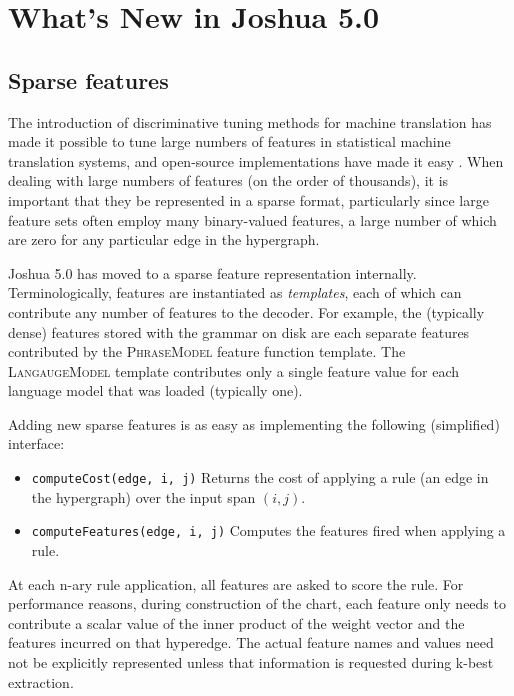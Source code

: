 \documentclass[11pt]{article}
\begin{document}
\section{What's New in Joshua 5.0}

\subsection{Sparse features}


The introduction of discriminative tuning methods for machine
translation \cite{liang2006end,chiang2008online,PRO2011} has made it
possible to tune large numbers of features in statistical machine
translation systems, and open-source implementations have made it easy
\cite{cherry2012batch}.  When dealing with large numbers of features
(on the order of thousands), it is important that they be represented
in a sparse format, particularly since large feature sets often employ
many binary-valued features, a large number of which are zero for any
particular edge in the hypergraph.

Joshua 5.0 has moved to a sparse feature representation
internally. Terminologically, features are instantiated as
\emph{templates}, each of which can contribute any number of features
to the decoder. For example, the (typically dense) features stored
with the grammar on disk are each separate features contributed by the
\textsc{PhraseModel} feature function template. The
\textsc{LangaugeModel} template contributes only a single feature
value for each language model that was loaded (typically one).

Adding new sparse features is as easy as implementing the following
(simplified) interface:
%
\begin{itemize}
\item \texttt{computeCost(edge, i, j)} Returns the cost of applying a
  rule (an edge in the hypergraph) over the input span $(i,j)$.
\item \texttt{computeFeatures(edge, i, j)} Computes the features fired
  when applying a rule.
\end{itemize}
%
At each n-ary rule application, all features are asked to score the
rule.  For performance reasons, during construction of the chart, each
feature only needs to contribute a scalar value of the inner product
of the weight vector and the features incurred on that hyperedge. The
actual feature names and values need not be explicitly represented
unless that information is requested during k-best extraction.
\end{document}
